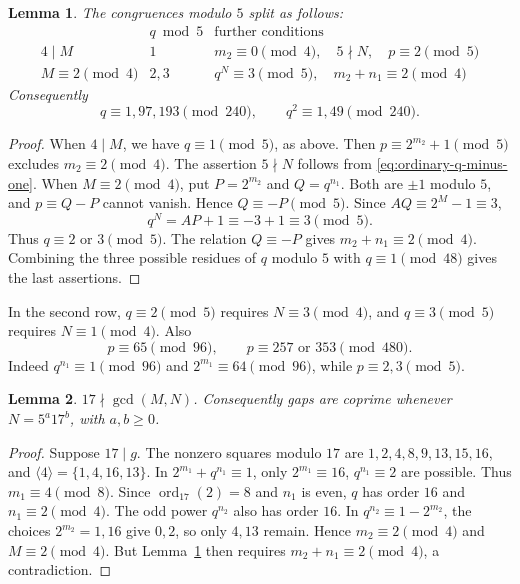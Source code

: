\documentclass[11pt]{article}
\newtheorem{lemma}{Lemma}
\begin{document}
\begin{lemma}\label{lem:mod-five-split}
The congruences modulo $5$ split as follows:
\[
\begin{array}{c|c|c}
 &q\bmod5&\text{further conditions}\\\hline
4\mid M&1&m_2\equiv0\pmod4,\quad5\nmid N,\quad p\equiv2\pmod5\\
M\equiv2\pmod4&2,3&q^N\equiv3\pmod5,\quad m_2+n_1\equiv2\pmod4
\end{array}
\]
Consequently
\[
q\equiv1,97,193\pmod{240},\qquad
q^2\equiv1,49\pmod{240}.
\]
\end{lemma}
\begin{proof}
When $4\mid M$, we have $q\equiv1\pmod5$, as above.
Then $p\equiv2^{m_2}+1\pmod5$ excludes $m_2\equiv2\pmod4$.
The assertion $5\nmid N$ follows from \eqref{eq:ordinary-q-minus-one}.
When $M\equiv2\pmod4$, put $P=2^{m_2}$ and $Q=q^{n_1}$.
Both are $\pm1$ modulo $5$, and $p\equiv Q-P$ cannot vanish.
Hence $Q\equiv-P\pmod5$. Since $AQ\equiv2^M-1\equiv3$,
\[
q^N=AP+1\equiv-3+1\equiv3\pmod5.
\]
Thus $q\equiv2$ or $3\pmod5$. The relation $Q\equiv-P$ gives
$m_2+n_1\equiv2\pmod4$. Combining the three possible residues
of $q$ modulo $5$ with $q\equiv1\pmod{48}$ gives the last assertions.
\end{proof}
In the second row, $q\equiv2\pmod5$ requires $N\equiv3\pmod4$,
and $q\equiv3\pmod5$ requires $N\equiv1\pmod4$.
Also
\[
p\equiv65\pmod{96},\qquad p\equiv257\text{ or }353\pmod{480}.
\]
Indeed $q^{n_1}\equiv1\pmod{96}$ and
$2^{m_1}\equiv64\pmod{96}$, while $p\equiv2,3\pmod5$.

\begin{lemma}\label{lem:exclude-seventeen}
$17\nmid\gcd(M,N)$. Consequently gaps are coprime whenever
$N=5^a17^b$, with $a,b\ge0$.
\end{lemma}
\begin{proof}
Suppose $17\mid g$. The nonzero squares modulo $17$ are
$1,2,4,8,9,13,15,16$, and
$\langle4\rangle=\{1,4,16,13\}$.
In $2^{m_1}+q^{n_1}\equiv1$, only
$2^{m_1}\equiv16$, $q^{n_1}\equiv2$ are possible.
Thus $m_1\equiv4\pmod8$. Since $\operatorname{ord}_{17}(2)=8$
and $n_1$ is even, $q$ has order $16$ and $n_1\equiv2\pmod4$.
The odd power $q^{n_2}$ also has order $16$.
In $q^{n_2}\equiv1-2^{m_2}$, the choices
$2^{m_2}=1,16$ give $0,2$, so only $4,13$ remain.
Hence $m_2\equiv2\pmod4$ and $M\equiv2\pmod4$.
But Lemma~\ref{lem:mod-five-split} then requires
$m_2+n_1\equiv2\pmod4$, a contradiction.
\end{proof}
\end{document}
